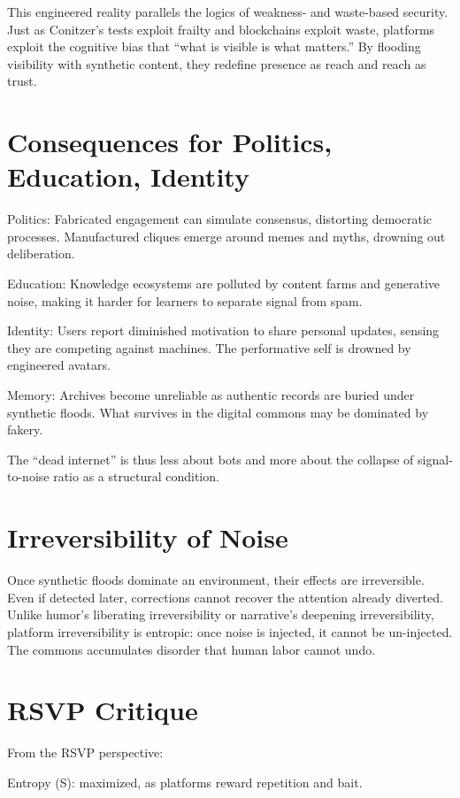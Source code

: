 \documentclass{book}
\begin{document}
This engineered reality parallels the logics of weakness- and waste-based security. Just as Conitzer’s tests exploit frailty and blockchains exploit waste, platforms exploit the cognitive bias that ``what is visible is what matters.'' By flooding visibility with synthetic content, they redefine presence as reach and reach as trust.

\section{Consequences for Politics, Education, Identity}

Politics: Fabricated engagement can simulate consensus, distorting democratic processes. Manufactured cliques emerge around memes and myths, drowning out deliberation.

Education: Knowledge ecosystems are polluted by content farms and generative noise, making it harder for learners to separate signal from spam.

Identity: Users report diminished motivation to share personal updates, sensing they are competing against machines. The performative self is drowned by engineered avatars.

Memory: Archives become unreliable as authentic records are buried under synthetic floods. What survives in the digital commons may be dominated by fakery.

The ``dead internet'' is thus less about bots and more about the collapse of signal-to-noise ratio as a structural condition.

\section{Irreversibility of Noise}

Once synthetic floods dominate an environment, their effects are irreversible. Even if detected later, corrections cannot recover the attention already diverted. Unlike humor’s liberating irreversibility or narrative’s deepening irreversibility, platform irreversibility is entropic: once noise is injected, it cannot be un-injected. The commons accumulates disorder that human labor cannot undo.

\section{RSVP Critique}

From the RSVP perspective:

Entropy (S): maximized, as platforms reward repetition and bait.
\end{document}
